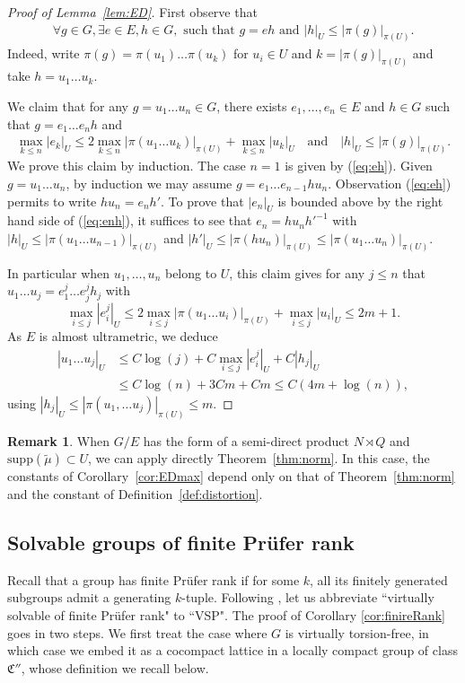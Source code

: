 \documentclass[11pt,leqno]{article}
\theoremstyle{plain}
\theoremstyle{definition}
\newtheorem{remark}[theorem]{Remark}
\theoremstyle{remark}
\numberwithin{equation}{section}
\begin{document}
\begin{proof}[Proof of Lemma~\ref{lem:ED}]
First observe that 
\begin{align}\label{eq:eh}
\forall g \in G, \exists e \in E, h\in G, \textrm{ such that } g=eh \textrm{ and } |h|_U \le |\pi(g)|_{\pi(U)}.
\end{align}
Indeed, write $\pi(g)=\pi(u_1)\dots \pi(u_k)$ for $u_i\in U$ and $k=|\pi(g)|_{\pi(U)}$ and take $h=u_1\dots u_k$.

We claim that for any $g=u_1\dots u_n\in G$, there exists $e_1,\dots,e_n \in E$ and $h \in G$ such that $g=e_1\dots e_n h$ and
\begin{align}\label{eq:enh}
\max_{k\le n} |e_k|_U \le 2\max_{k\le n}|\pi(u_1\dots u_k)|_{\pi(U)}+\max_{k\le n} |u_k|_U \quad \textrm{and} \quad |h|_U \le |\pi(g)|_{\pi(U)}.
\end{align} 
We prove this claim by induction. The case $n=1$ is given by (\ref{eq:eh}). Given $g=u_1\dots u_n$, by induction we may assume $g=e_1\dots e_{n-1}h u_n$. Observation (\ref{eq:eh}) permits to write $hu_n=e_nh'$. To prove that $|e_n|_U$ is bounded above by the right hand side of (\ref{eq:enh}), it suffices to see that $e_n=h u_n h'^{-1}$ with $|h|_U \le |\pi(u_1\dots u_{n-1})|_{\pi(U)}$ and $|h'|_U \le |\pi(hu_n)|_{\pi(U)} \le |\pi(u_1\dots u_n)|_{\pi(U)}$. 

In particular when $u_1,\dots, u_n$ belong to $U$, this claim gives for any $j \le n$ that $u_1\dots u_j=e_1^j\dots e_j^jh_j$ with 
\[
\max_{i \le j} |e_i^j|_U \le 2\max_{i\le j} |\pi(u_1\dots u_i)|_{\pi(U)}+\max_{i\le j}|u_i|_U\le 2m+1.
\]
As $E$ is almost ultrametric, we deduce
\begin{align*}
|u_1\dots u_j|_U & \le C \log(j)+C\max_{i \le j}|e_i^j|_U+C|h_j|_U \\
& \le C\log(n)+3Cm+Cm \le C(4m+\log(n)),
\end{align*}
using $|h_j|_U \le |\pi(u_1,\dots u_j)|_{\pi(U)} \le m$.
\end{proof}

\begin{remark}
When $G/E$ has the form of a semi-direct product $N\rtimes Q$ and $\mathrm{supp}(\tilde{\mu}) \subset U$, we can apply directly Theorem~\ref{thm:norm}. In this case, the constants of Corollary~\ref{cor:EDmax} depend only on that of Theorem~\ref{thm:norm} and the constant of Definition~\ref{def:distortion}.
\end{remark}


\subsection{Solvable groups of finite Pr\"ufer rank}\label{sec:FiniteRank}
Recall that a group has finite Pr\"ufer rank if for some $k$, all its finitely generated subgroups admit a generating $k$-tuple.
Following \cite{CT},  let us abbreviate ``virtually solvable of finite Pr\"ufer rank" to ``VSP".  The proof of Corollary \ref{cor:finireRank} goes in two steps. We first treat the case where $G$ is virtually torsion-free, in which case we embed it as a cocompact lattice in a locally compact group of class $\mathfrak{C}''$, whose definition we recall below.
\end{document}
